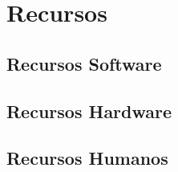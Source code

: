 \chapter{Recursos}


\section{Recursos Software}


\section{Recursos Hardware}


\section{Recursos Humanos}


